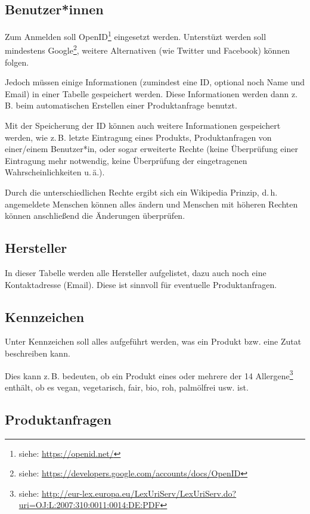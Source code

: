 \documentclass[a4paper]{report}
\begin{document}
\subsection{Benutzer*innen}

Zum Anmelden soll OpenID\footnote{siehe: \url{https://openid.net/}} eingesetzt werden.
Unterstüzt werden soll mindestens Google\footnote{siehe:
\url{https://developers.google.com/accounts/docs/OpenID}},
weitere Alternativen (wie Twitter und Facebook) können folgen.

Jedoch müssen einige Informationen (zumindest eine ID, optional noch
Name und Email) in einer Tabelle gespeichert werden. Diese
Informationen werden dann z.\,B. beim automatischen Erstellen einer
Produktanfrage benutzt.

Mit der Speicherung der ID können auch weitere Informationen
gespeichert werden, wie z.\,B. letzte Eintragung eines Produkts,
Produktanfragen von einer/einem Benutzer*in, oder sogar erweiterte Rechte
(keine Überprüfung einer Eintragung mehr notwendig, keine
Überprüfung der eingetragenen Wahrscheinlichkeiten u.\,ä.).

Durch die unterschiedlichen Rechte ergibt sich ein Wikipedia Prinzip,
d.\,h. angemeldete Menschen können alles ändern und Menschen mit
höheren Rechten können anschließend die Änderungen überprüfen.

\subsection{Hersteller}

In dieser Tabelle werden alle Hersteller aufgelistet, dazu auch noch
eine Kontaktadresse (Email). Diese ist sinnvoll für eventuelle
Produktanfragen.

\subsection{Kennzeichen}

Unter Kennzeichen soll alles aufgeführt werden, was ein Produkt bzw.
eine Zutat beschreiben kann.

Dies kann z.\,B. bedeuten, ob ein Produkt eines oder mehrere der 14
Allergene\footnote{siehe:
\url{http://eur-lex.europa.eu/LexUriServ/LexUriServ.do?uri=OJ:L:2007:310:0011:0014:DE:PDF}}
enthält, ob es vegan, vegetarisch, fair, bio, roh,
palmölfrei usw. ist.

\subsection{Produktanfragen}
\end{document}
